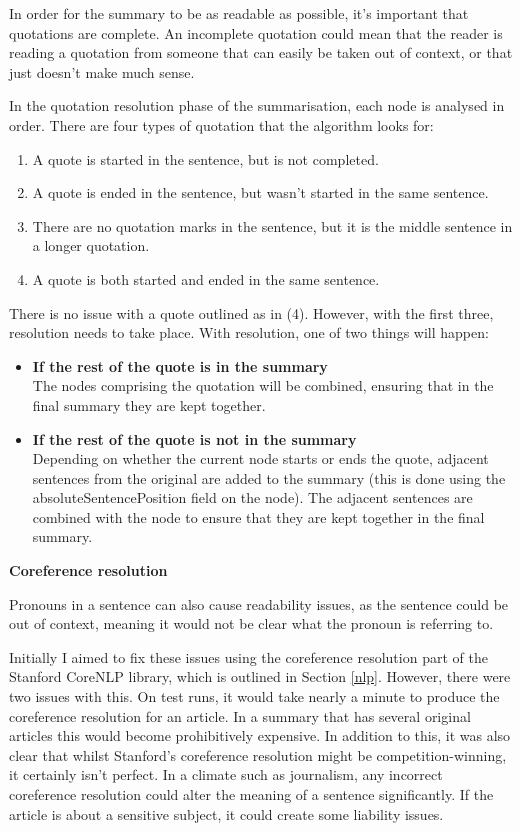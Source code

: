\documentclass[12pt]{article}
\begin{document}
In order for the summary to be as readable as possible, it's important that quotations are complete. An incomplete quotation could mean that the reader is reading a quotation from someone that can easily be taken out of context, or that just doesn't make much sense.

In the quotation resolution phase of the summarisation, each node is analysed in order. There are four types of quotation that the algorithm looks for:

\begin{enumerate}
	\item A quote is started in the sentence, but is not completed.
	\item A quote is ended in the sentence, but wasn't started in the same sentence.
	\item There are no quotation marks in the sentence, but it is the middle sentence in a longer quotation.
	\item A quote is both started and ended in the same sentence.
\end{enumerate}

There is no issue with a quote outlined as in (4). However, with the first three, resolution needs to take place. With resolution, one of two things will happen:

\begin{itemize}
	\item \textbf{If the rest of the quote is in the summary} \\ The nodes comprising the quotation will be combined, ensuring that in the final summary they are kept together. 
	\item \textbf{If the rest of the quote is not in the summary} \\ Depending on whether the current node starts or ends the quote, adjacent sentences from the original are added to the summary (this is done using the absoluteSentencePosition field on the node). The adjacent sentences are combined with the node to ensure that they are kept together in the final summary. \\
\end{itemize}

\textbf{Coreference resolution}

Pronouns in a sentence can also cause readability issues, as the sentence could be out of context, meaning it would not be clear what the pronoun is referring to.

Initially I aimed to fix these issues using the coreference resolution part of the Stanford CoreNLP library, which is outlined in Section \ref{nlp}. However, there were two issues with this. On test runs, it would take nearly a minute to produce the coreference resolution for an article. In a summary that has several original articles this would become prohibitively expensive. In addition to this, it was also clear that whilst Stanford's coreference resolution might be competition-winning, it certainly isn't perfect. In a climate such as journalism, any incorrect coreference resolution could alter the meaning of a sentence significantly. If the article is about a sensitive subject, it could create some liability issues.
\end{document}
